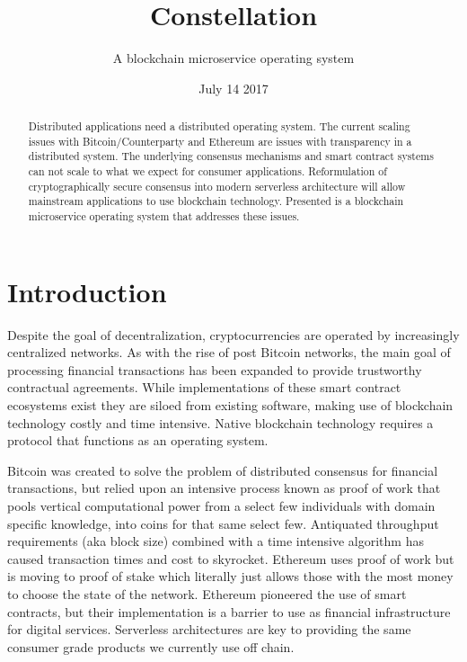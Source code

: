 \documentclass{article}
\title{Constellation}
\author{A blockchain microservice operating system}
\date{July 14 2017}
\begin{document}
\maketitle

\begin{abstract}
Distributed applications need a distributed operating system. The current scaling issues with Bitcoin/Counterparty and Ethereum are issues with transparency in a distributed system. The underlying consensus mechanisms and smart contract systems can not scale to what we expect for consumer applications. Reformulation of cryptographically secure consensus into modern serverless architecture will allow mainstream applications to use blockchain technology. Presented is a blockchain microservice operating system that addresses these issues.\

\end{abstract}
\setcounter{secnumdepth}{0}
\section{Introduction}
Despite the goal of decentralization, cryptocurrencies are operated by increasingly centralized networks. As with the rise of post Bitcoin networks, the main goal of processing financial transactions has been expanded to provide trustworthy contractual agreements. While implementations of these smart contract ecosystems exist they are siloed from existing software, making use of blockchain technology costly and time intensive. Native blockchain technology requires a protocol that functions as an operating system. 

Bitcoin was created to solve the problem of distributed consensus for financial transactions, but relied upon an intensive process known as proof of work that pools vertical computational power from a select few individuals with domain specific knowledge, into coins for that same select few. Antiquated throughput requirements (aka block size) combined with a time intensive algorithm has caused transaction times and cost to skyrocket. Ethereum uses proof of work but is moving to proof of stake which literally just allows those with the most money to choose the state of the network. Ethereum pioneered the use of smart contracts, but their implementation is a barrier to use as financial infrastructure for digital services. Serverless architectures are key to providing the same consumer grade products we currently use off chain.
\end{document}
